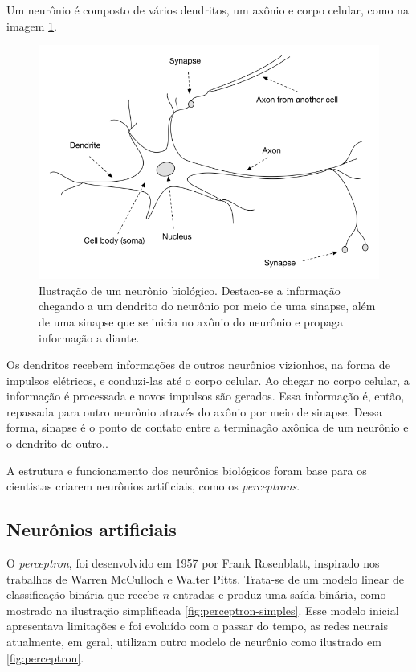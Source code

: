 Um neurônio é composto de vários dendritos, um axônio e corpo 
celular, como na imagem \ref{fig:neuron}. 

\begin{figure}[H] 
  \includegraphics[width= 12cm]{../figuras/neuron.png}
  \caption{Ilustração de um neurônio biológico. \cite{dl-oreilly}
  Destaca-se a informação chegando a um dendrito do neurônio
  por meio de uma sinapse, além de uma sinapse que se inicia no axônio 
  do neurônio e propaga informação a diante.
  }
  \label{fig:neuron}
\end{figure}

Os dendritos recebem 
informações de outros neurônios vizionhos, na forma de impulsos
elétricos, e conduzi-las até o corpo celular. Ao chegar no corpo
celular, a informação é processada e novos impulsos são gerados. 
Essa informação é, então, repassada para outro neurônio 
através do axônio por meio de sinapse. Dessa forma, sinapse é o
ponto de contato entre a terminação axônica de um neurônio e o 
dendrito de outro.\cite{deeplearningbook}. 

A estrutura e funcionamento dos neurônios biológicos foram 
base para os cientistas criarem neurônios artificiais, como 
os \textit{perceptrons}. 

\subsection{Neurônios artificiais}

O \textit{perceptron}, foi desenvolvido em 1957 por Frank 
Rosenblatt, inspirado nos trabalhos de Warren McCulloch e Walter Pitts.
Trata-se de um modelo linear de classificação binária que 
recebe $n$ entradas e produz uma saída binária, como mostrado 
na ilustração simplificada \ref{fig:perceptron-simples}.\cite{deeplearningbook}
Esse modelo inicial apresentava limitações e foi evoluído com o passar do 
tempo, as redes neurais atualmente, em geral, utilizam 
outro modelo de neurônio como ilustrado em \ref{fig:perceptron}.


